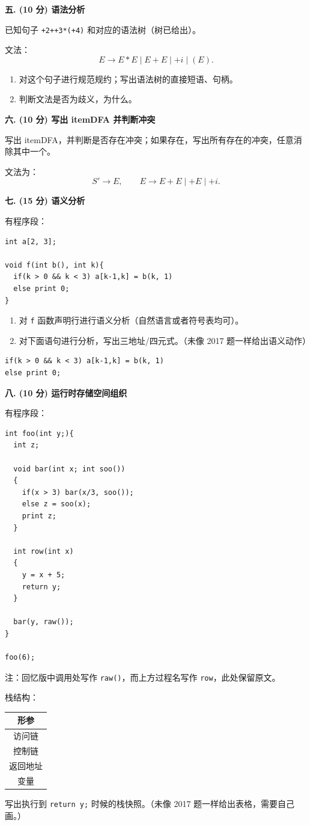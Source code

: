 \documentclass[UTF8,zihao=-4]{ctexart}
\newcommand{\score}[1]{\textbf{(#1 分)}}
\newcommand{\gto}{\rightarrow}
\newcommand{\kw}[1]{\texttt{#1}}
\newcommand{\qtitle}[3]{\vspace{0.8em}\textbf{#1. \score{#2} #3}\par}
\begin{document}
\qtitle{五}{10}{语法分析}

已知句子 \kw{+2++3*(+4)} 和对应的语法树（树已给出）。

文法：
\[
E\gto E*E \mid E+E \mid +i \mid (E).
\]

\begin{enumerate}[label=(\arabic*)]
  \item 对这个句子进行规范规约；写出语法树的直接短语、句柄。
  \item 判断文法是否为歧义，为什么。
\end{enumerate}

\qtitle{六}{10}{写出 itemDFA 并判断冲突}

写出 itemDFA，并判断是否存在冲突；如果存在，写出所有存在的冲突，任意消除其中一个。

文法为：
\[
S'\gto E,\qquad E\gto E+E \mid +E \mid +i.
\]

\qtitle{七}{15}{语义分析}

有程序段：
\begin{lstlisting}
int a[2, 3];

void f(int b(), int k){
  if(k > 0 && k < 3) a[k-1,k] = b(k, 1)
  else print 0;
}
\end{lstlisting}

\begin{enumerate}[label=(\arabic*)]
  \item 对 \kw{f} 函数声明行进行语义分析（自然语言或者符号表均可）。
  \item 对下面语句进行分析，写出三地址/四元式。（未像 2017 题一样给出语义动作）
\end{enumerate}

\begin{lstlisting}
if(k > 0 && k < 3) a[k-1,k] = b(k, 1)
else print 0;
\end{lstlisting}

\qtitle{八}{10}{运行时存储空间组织}

有程序段：
\begin{lstlisting}
int foo(int y;){
  int z;

  void bar(int x; int soo())
  {
    if(x > 3) bar(x/3, soo());
    else z = soo(x);
    print z;
  }

  int row(int x)
  {
    y = x + 5;
    return y;
  }

  bar(y, raw());
}

foo(6);
\end{lstlisting}

注：回忆版中调用处写作 \kw{raw()}，而上方过程名写作 \kw{row}，此处保留原文。

栈结构：
\begin{center}
\begin{tabular}{|c|}
\hline
形参\\
\hline
访问链\\
\hline
控制链\\
\hline
返回地址\\
\hline
变量\\
\hline
\end{tabular}
\end{center}

写出执行到 \kw{return y;} 时候的栈快照。（未像 2017 题一样给出表格，需要自己画。）
\end{document}
